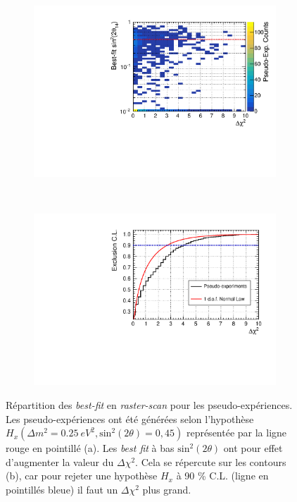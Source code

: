{\begin{figure}[h!]
\centering
\begin{subfigure}[b]{0.49\textwidth}
\centering
\includegraphics[width=1\linewidth]{images/bestfit_vs_chi2.pdf}
\caption{}
\label{fig:bestfit_vs_chi2.pdf}
\end{subfigure}
~ %
\begin{subfigure}[b]{0.49\textwidth}
\centering
\includegraphics[width=1\linewidth]{images/comparison_cumulative.pdf}
\caption{}
\label{fig:comparison_cumulative.pdf}
\end{subfigure}

\caption[Répartition des \textit{best-fit} en \textit{raster-scan} pour les pseudo-expériences]{Répartition des \textit{best-fit} en \textit{raster-scan} pour les pseudo-expériences. Les pseudo-expériences ont été générées selon l'hypothèse $H_x(\Delta m^2 = \SI{0.25}{eV^2}, \textrm{sin}^2(2\theta) = 0,45)$ représentée par la ligne rouge en pointillé (a). Les \textit{best fit} à bas $\textrm{sin}^2(2\theta)$ ont pour effet d'augmenter la valeur du $\Delta\chi^2$. Cela se répercute sur les contours (b), car pour rejeter une hypothèse $H_x$ à 90 \% C.L. (ligne en pointillés bleue) il faut un $\Delta\chi^2$ plus grand.}
\label{fig:bestfit_vs_deltachi2}
\end{figure}

\clearpage

}

